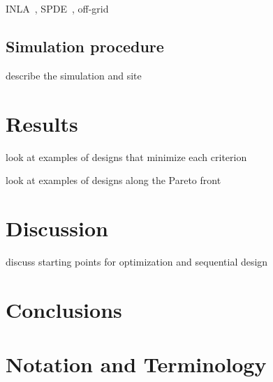 \documentclass[review]{elsarticle}
\begin{document}
INLA~\citep{rueetal}, SPDE~\citep{lindgrenetal}, off-grid~\citep{simpsonetal}


\subsection{Simulation procedure}

describe the simulation and site




\section{Results}

look at examples of designs that minimize each criterion

look at examples of designs along the Pareto front


\section{Discussion}

discuss starting points for optimization and sequential design


\section{Conclusions}


\appendix
\section{Notation and Terminology}
\end{document}

